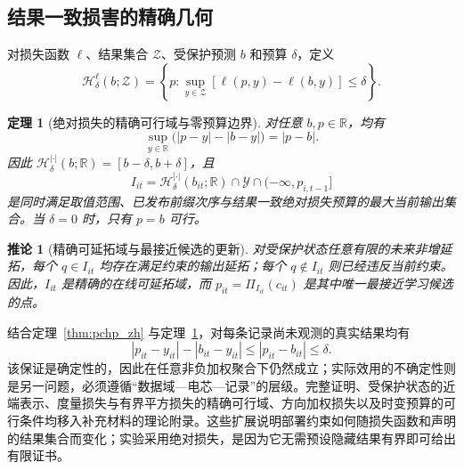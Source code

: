 \documentclass[UTF8,11pt]{ctexart}
\newtheorem{theorem}{定理}
\newtheorem{corollary}{推论}
\begin{document}
\subsection{结果一致损害的精确几何}

对损失函数 \(\ell\)、结果集合 \(\mathcal Z\)、受保护预测 \(b\) 和预算 \(\delta\)，定义
\begin{equation}
 \mathcal H^\ell_\delta(b;\mathcal Z)
 =\left\{p:\sup_{y\in\mathcal Z}
 [\ell(p,y)-\ell(b,y)]\leq\delta\right\}.
 \label{eq:generic_harm_region_zh}
\end{equation}

\begin{theorem}[绝对损失的精确可行域与零预算边界]
\label{thm:harm_region_zh}
对任意 \(b,p\in\mathbb R\)，均有
\begin{equation}
 \sup_{y\in\mathbb R}\bigl(|p-y|-|b-y|\bigr)=|p-b|.
 \label{eq:harm_region_zh}
\end{equation}
因此 \(\mathcal H^{|\cdot|}_\delta(b;\mathbb R)=[b-\delta,b+\delta]\)，且
\begin{equation}
 I_{it}=\mathcal H^{|\cdot|}_\delta(b_{it};\mathbb R)
 \cap\mathcal Y\cap(-\infty,p_{i,t-1}]
 \label{eq:maximal_interval_zh}
\end{equation}
是同时满足取值范围、已发布前缀次序与结果一致绝对损失预算的最大当前输出集合。当 \(\delta=0\) 时，只有 \(p=b\) 可行。
\end{theorem}

\begin{corollary}[精确可延拓域与最接近候选的更新]
\label{cor:viability_kernel_zh}
\label{cor:optimality_zh}
对受保护状态任意有限的未来非增延拓，每个 \(q\in I_{it}\) 均存在满足约束的输出延拓；每个 \(q\notin I_{it}\) 则已经违反当前约束。因此，\(I_{it}\) 是精确的在线可延拓域，而 \(p_{it}=\Pi_{I_{it}}(c_{it})\) 是其中唯一最接近学习候选的点。
\end{corollary}

结合定理~\ref{thm:pchp_zh} 与定理~\ref{thm:harm_region_zh}，对每条记录尚未观测的真实结果均有
\begin{equation}
 |p_{it}-y_{it}|-|b_{it}-y_{it}|
 \leq |p_{it}-b_{it}|\leq\delta.
 \label{eq:pointwise_harm_zh}
\end{equation}
该保证是确定性的，因此在任意非负加权聚合下仍然成立；实际效用的不确定性则是另一问题，必须遵循“数据域—电芯—记录”的层级。完整证明、受保护状态的近端表示、度量损失与有界平方损失的精确可行域、方向加权损失以及时变预算的可行条件均移入补充材料的理论附录。这些扩展说明部署约束如何随损失函数和声明的结果集合而变化；实验采用绝对损失，是因为它无需预设隐藏结果有界即可给出有限证书。
\end{document}
